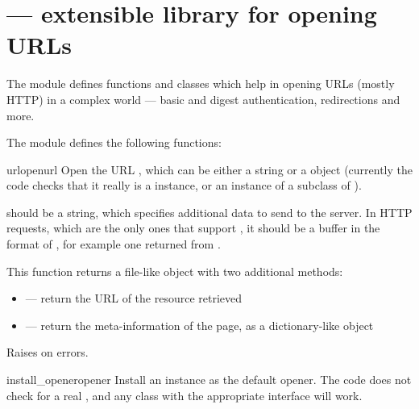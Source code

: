 \section{ ---
         extensible library for opening URLs}



The  module defines functions and classes which help
in opening URLs (mostly HTTP) in a complex world --- basic and digest
authentication, redirections and more.

The  module defines the following functions:

\begin{funcdesc}{urlopen}{url}
Open the URL , which can be either a string or a 
object (currently the code checks that it really is a 
instance, or an instance of a subclass of ).

 should be a string, which specifies additional data to
send to the server. In HTTP requests, which are the only ones that
support , it should be a buffer in the format of
, for example one returned
from .

This function returns a file-like object with two additional methods:

\begin{itemize}
  \item {} --- return the URL of the resource retrieved
  \item {} --- return the meta-information of the page, as
                            a dictionary-like object
\end{itemize}

Raises  on errors.
\end{funcdesc}

\begin{funcdesc}{install_opener}{opener}
Install an  instance as the default opener.
The code does not check for a real , and any
class with the appropriate interface will work.
\end{funcdesc}

